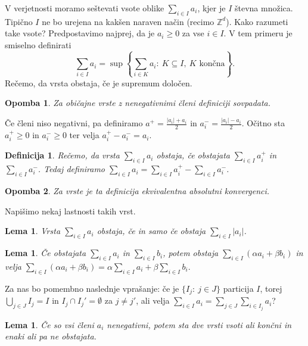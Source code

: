 \documentclass[10pt, a4paper]{article}
\newtheorem{defi}[izr]{Definicija}
\newenvironment{noticeB}{%
  \tcolorbox[%
  notitle,
  empty,
  enhanced,  %
  breakable,
  coltext=black,
  colback=white, 
  fontupper=\rmfamily,
  parbox=false,
  noparskip,
  sharp corners,
  boxrule=-1pt,  %
  frame hidden,
  left=7pt,  %
  right=7pt,
  top=5pt,
  bottom=5pt,
  before skip=2.5ex plus 2pt,
  after skip=2.5ex plus 2pt,
  borderline west = {1.5pt}{-0.1pt}{blue!30!black}, %
  overlay unbroken and last={%
    \draw[color=black, line width=1.25pt]
    ($(frame.south west)+(1.pt, -0.1pt)$) -- ++(2em, 0);
  }
  ]}
{\endtcolorbox}
\newenvironment{definicija}{\begin{defi}\begin{noticeB}}{%
    \end{noticeB}\end{defi}}
\newtheorem*{opomba}{Opomba}
\newtheorem{lema}[izr]{Lema}
\newcommand{\Z}{\mathbb {Z}}
\begin{document}
V verjetnosti moramo seštevati vsote oblike $\sum_{i \in I} a_i$,
kjer je $I$ števna množica. Tipično $I$ ne bo urejena na kakšen naraven način 
(recimo $\Z^d$). Kako razumeti take vsote? Predpostavimo najprej, da je $a_i \geq 0$ za vse $i \in I$.
V tem primeru je smiselno definirati 
$$\sum_{i \in I} a_i = \sup \left\lbrace \sum_{i \in K} a_i:\ K \subseteq I,\ \text{$K$ končna} \right\rbrace.$$
Rečemo, da vrsta obstaja, če je supremum določen.

\begin{opomba}
  Za običajne vrste z nenegativnimi členi definiciji sovpadata.
\end{opomba}

Če členi niso negativni, pa definiramo $a^+ = \frac{|a_i| + a_i}{2}$ in $a_i^- = \frac{|a_i| - a_i}{2}$.
Očitno sta $a_i ^+ \geq 0$ in $a_i^- \geq 0$ ter velja $a_i^+ - a_i^- = a_i$.

\begin{definicija}
  Rečemo, da vrsta $\sum_{i \in I} a_i$ obstaja, če obstajata $\sum_{i \in I}a_i^+$ in $\sum_{i \in I} a_i^-$.
  Tedaj definiramo $\sum_{i \in I} a_i = \sum_{i \in I} a_i^+ - \sum_{i \in I} a_i^-$. 
\end{definicija}

\begin{opomba}
  Za vrste je ta definicija ekvivalentna absolutni konvergenci.
\end{opomba}

Napišimo nekaj lastnosti takih vrst.

\begin{lema}
  Vrsta $\sum_{i \in I} a_i$ obstaja, če in samo če obstaja $\sum_{i \in I} |a_i|$.
\end{lema}

\begin{lema}
  Če obstajata $\sum_{i \in I} a_i$ in $\sum_{i \in I} b_i$, potem obstaja $\sum_{i \in I} (\alpha a_i + \beta b_i)$
  in velja $\sum_{i \in I} (\alpha a_i + \beta b_i) = \alpha \sum_{i \in I} a_i + \beta \sum_{i \in I} b_i.$ 
\end{lema}

Za nas bo pomembno naslednje vprašanje: če je $\{I_j:\ j \in J\}$ particija $I$,
torej $\bigcup_{j \in J} I_j = I$ in $I_j \cap I_j' = \emptyset$ za $j \neq j'$,
ali velja $\sum_{i \in I} a_i = \sum_{j \in J} \sum_{i \in I_j} a_i$?

\begin{lema}
  Če so vsi členi $a_i$ nenegativni, potem sta dve vrsti vsoti ali končni in enaki ali pa ne obstajata.
\end{lema}
\end{document}

